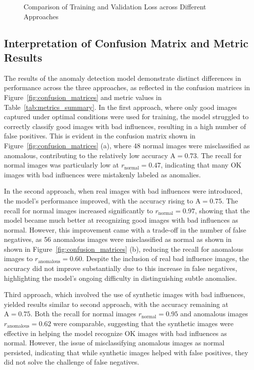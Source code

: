 \documentclass[12pt,DIV14,BCOR12mm,a4paper,footinclude=false,headinclude,parskip=half-,twoside,openright,cleardoublepage=empty,toc=index,bibliography=totoc,listof=totoc]{scrreprt}
\numberwithin{equation}{chapter}
\begin{document}
\begin{figure}
    \caption{Comparison of Training and Validation Loss across Different Approaches}
    \label{fig:loss_plots}
\end{figure}


\subsection{Interpretation of Confusion Matrix and Metric Results}

The results of the anomaly detection model demonstrate distinct differences in performance across the three approaches, as reflected in the confusion matrices in Figure~\ref{fig:confusion_matrices} and metric values in Table~\ref{tab:metrics_summary}. In the first approach, where only good images captured under optimal conditions were used for training, the model struggled to correctly classify good images with bad influences, resulting in a high number of false positives. This is evident in the confusion matrix shown in Figure~\ref{fig:confusion_matrices} (a), where 48 normal images were misclassified as anomalous, contributing to the relatively low accuracy \( \text{A} = 0.73 \). The recall for normal images was particularly low at \( r_{\text{normal}} = 0.47 \), indicating that many OK images with bad influences were mistakenly labeled as anomalies.

In the second approach, when real images with bad influences were introduced, the model’s performance improved, with the accuracy rising to \( \text{A} = 0.75 \). The recall for normal images increased significantly to \( r_{\text{normal}} = 0.97 \), showing that the model became much better at recognizing good images with bad influences as normal. However, this improvement came with a trade-off in the number of false negatives, as 56 anomalous images were misclassified as normal as shown in shown in Figure~\ref{fig:confusion_matrices} (b), reducing the recall for anomalous images to \( r_{\text{anomalous}} = 0.60 \). Despite the inclusion of real bad influence images, the accuracy did not improve substantially due to this increase in false negatives, highlighting the model's ongoing difficulty in distinguishing subtle anomalies.

Third approach, which involved the use of synthetic images with bad influences, yielded results similar to second approach, with the accuracy remaining at \( \text{A} = 0.75 \). Both the recall for normal images \( r_{\text{normal}} = 0.95 \) and anomalous images \( r_{\text{anomalous}} = 0.62 \) were comparable, suggesting that the synthetic images were effective in helping the model recognize OK images with bad influences as normal. However, the issue of misclassifying anomalous images as normal persisted, indicating that while synthetic images helped with false positives, they did not solve the challenge of false negatives.
\end{document}
